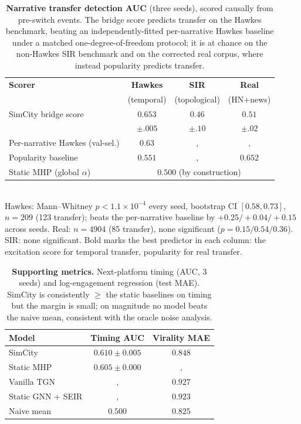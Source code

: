 \documentclass[11pt]{article}
\begin{document}
\begin{table}[t]
\centering
\small
\caption{\textbf{Narrative transfer detection AUC} (three seeds), scored
causally from pre-switch events. The bridge score predicts transfer on the
Hawkes benchmark, beating an independently-fitted per-narrative Hawkes baseline
under a matched one-degree-of-freedom protocol; it is at chance on the
non-Hawkes SIR benchmark and on the corrected real corpus, where instead
popularity predicts transfer.}
\label{tab:transfer}
\begin{tabular}{lccc}
\toprule
\textbf{Scorer} & \textbf{Hawkes} & \textbf{SIR} & \textbf{Real} \\
 & (temporal) & (topological) & (HN+news) \\
\midrule
SimCity bridge score & $\mathbf{0.653}$ & $0.46$ & $0.51$ \\
 & \footnotesize$\pm.005$ & \footnotesize$\pm.10$ & \footnotesize$\pm.02$ \\
Per-narrative Hawkes (val-sel.) & $0.63$ &, &, \\
Popularity baseline & $0.551$ &, & $\mathbf{0.652}$ \\
Static MHP (global $\alpha$) & \multicolumn{3}{c}{$0.500$ (by construction)} \\
\bottomrule
\end{tabular}
\\[2pt]
\footnotesize Hawkes: Mann--Whitney $p < 1.1\times10^{-4}$ every seed, bootstrap
CI $[0.58, 0.73]$, $n=209$ (123 transfer); beats the per-narrative baseline by
$+0.25/+0.04/+0.15$ across seeds. Real: $n=4904$ (85 transfer), none
significant ($p = 0.15/0.54/0.36$). SIR: none significant. Bold marks the best
predictor in each column: the excitation score for temporal transfer,
popularity for real transfer.
\end{table}

\begin{table}[t]
\centering
\small
\caption{\textbf{Supporting metrics.} Next-platform timing (AUC, 3 seeds) and
log-engagement regression (test MAE). SimCity is consistently $\ge$ the static
baselines on timing but the margin is small; on magnitude no model beats the
naive mean, consistent with the oracle noise analysis.}
\label{tab:supporting}
\begin{tabular}{lcc}
\toprule
\textbf{Model} & \textbf{Timing AUC} & \textbf{Virality MAE} \\
\midrule
SimCity              & $\mathbf{0.610 \pm 0.005}$ & $0.848$ \\
Static MHP           & $0.605 \pm 0.000$          &, \\
Vanilla TGN          &,                        & $0.927$ \\
Static GNN + SEIR    &,                        & $0.923$ \\
Naive mean           & $0.500$                    & $\mathbf{0.825}$ \\
\bottomrule
\end{tabular}
\end{table}
\end{document}
